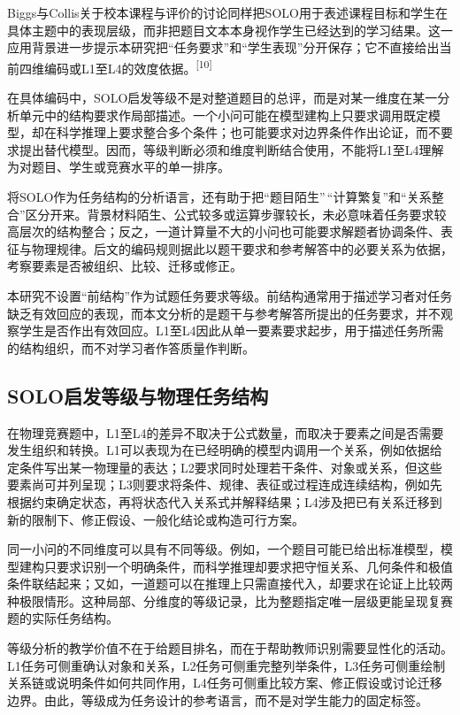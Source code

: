 \documentclass[
  12pt,
  a4paper]{ctexbook}
\begin{document}
Biggs与Collis关于校本课程与评价的讨论同样把SOLO用于表述课程目标和学生在具体主题中的表现层级，而非把题目文本本身视作学生已经达到的学习结果。这一应用背景进一步提示本研究把``任务要求''和``学生表现''分开保存；它不直接给出当前四维编码或L1至L4的效度依据。\textsuperscript{[10]}

在具体编码中，SOLO启发等级不是对整道题目的总评，而是对某一维度在某一分析单元中的结构要求作局部描述。一个小问可能在模型建构上只要求调用既定模型，却在科学推理上要求整合多个条件；也可能要求对边界条件作出论证，而不要求提出替代模型。因而，等级判断必须和维度判断结合使用，不能将L1至L4理解为对题目、学生或竞赛水平的单一排序。

将SOLO作为任务结构的分析语言，还有助于把``题目陌生''\,``计算繁复''和``关系整合''区分开来。背景材料陌生、公式较多或运算步骤较长，未必意味着任务要求较高层次的结构整合；反之，一道计算量不大的小问也可能要求解题者协调条件、表征与物理规律。后文的编码规则据此以题干要求和参考解答中的必要关系为依据，考察要素是否被组织、比较、迁移或修正。

本研究不设置``前结构''作为试题任务要求等级。前结构通常用于描述学习者对任务缺乏有效回应的表现，而本文分析的是题干与参考解答所提出的任务要求，并不观察学生是否作出有效回应。L1至L4因此从单一要素要求起步，用于描述任务所需的结构组织，而不对学习者作答质量作判断。

\subsection{SOLO启发等级与物理任务结构}\label{soloux542fux53d1ux7b49ux7ea7ux4e0eux7269ux7406ux4efbux52a1ux7ed3ux6784}

在物理竞赛题中，L1至L4的差异不取决于公式数量，而取决于要素之间是否需要发生组织和转换。L1可以表现为在已经明确的模型内调用一个关系，例如依据给定条件写出某一物理量的表达；L2要求同时处理若干条件、对象或关系，但这些要素尚可并列呈现；L3则要求将条件、规律、表征或过程连成连续结构，例如先根据约束确定状态，再将状态代入关系式并解释结果；L4涉及把已有关系迁移到新的限制下、修正假设、一般化结论或构造可行方案。

同一小问的不同维度可以具有不同等级。例如，一个题目可能已给出标准模型，模型建构只要求识别一个明确条件，而科学推理却要求把守恒关系、几何条件和极值条件联结起来；又如，一道题可以在推理上只需直接代入，却要求在论证上比较两种极限情形。这种局部、分维度的等级记录，比为整题指定唯一层级更能呈现复赛题的实际任务结构。

等级分析的教学价值不在于给题目排名，而在于帮助教师识别需要显性化的活动。L1任务可侧重确认对象和关系，L2任务可侧重完整列举条件，L3任务可侧重绘制关系链或说明条件如何共同作用，L4任务可侧重比较方案、修正假设或讨论迁移边界。由此，等级成为任务设计的参考语言，而不是对学生能力的固定标签。
\end{document}
